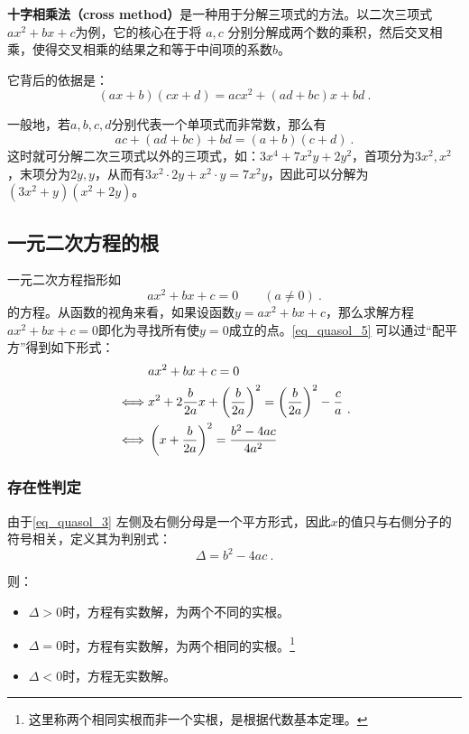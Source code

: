 \textbf{十字相乘法（cross method）}是一种用于分解三项式的方法。以二次三项式$ax^2 + bx + c$为例，它的核心在于将 $a,c$ 分别分解成两个数的乘积，然后交叉相乘，使得交叉相乘的结果之和等于中间项的系数$b$。

它背后的依据是：
\begin{equation}
(ax+b)(cx+d)=acx^2+(ad+bc)x+bd~.
\end{equation}

一般地，若$a,b,c,d$分别代表一个单项式而非常数，那么有
\begin{equation}
ac+(ad+bc)+bd=(a+b)(c+d)~.
\end{equation}
这时就可分解二次三项式以外的三项式，如：$3x^4+7x^2y+2y^2$，首项分为$3x^2,x^2$，末项分为$2y,y$，从而有$3x^2\cdot2y+x^2\cdot y=7x^2y$，因此可以分解为$(3x^2+y)(x^2+2y)$。

\subsection{一元二次方程的根}

一元二次方程指形如
\begin{equation}\label{eq_quasol_5}
ax^2+bx+c=0 \qquad (a\neq 0)~.
\end{equation}
的方程。从函数的视角来看，如果设函数$y=ax^2+bx+c$，那么求解方程$ax^2+bx+c=0$即化为寻找所有使$y=0$成立的点。\autoref{eq_quasol_5} 可以通过“配平方”得到如下形式：
\begin{equation}\label{eq_quasol_3}
\begin{split}
 & ax^2+bx+c = 0 \\ 
\iff&x^2+2{b\over 2a} x+\left({b\over 2a}\right)^2 = \left({b\over 2a}\right)^2-{c\over a} \\ 
\iff&\left(x+{b\over 2a}\right)^2 = {b^2-4ac\over 4a^2} \\ 
\end{split}~.
\end{equation}

\subsubsection{存在性判定}

由于\autoref{eq_quasol_3} 左侧及右侧分母是一个平方形式，因此$x$的值只与右侧分子的符号相关，定义其为判别式：
\begin{equation}\label{eq_quasol_4}
\Delta = b^2-4ac~.
\end{equation}

则：
\begin{itemize}
\item $\Delta > 0$时，方程有实数解，为两个不同的实根。
\item $\Delta = 0$时，方程有实数解，为两个相同的实根。\footnote{这里称两个相同实根而非一个实根，是根据代数基本定理。}
\item $\Delta < 0$时，方程无实数解。
\end{itemize}

